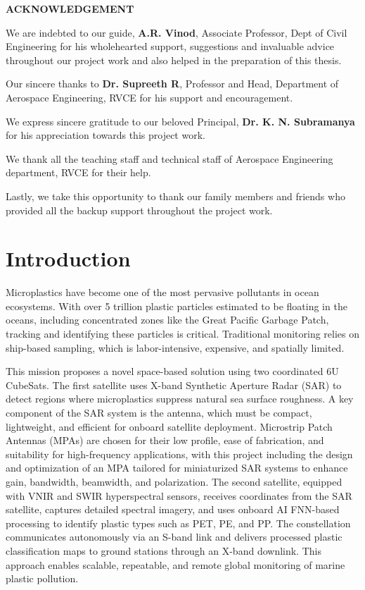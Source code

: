 \documentclass[12pt]{article}
\begin{document}
\newpage
\thispagestyle{empty}

\begin{center}
{\Large \textbf{ACKNOWLEDGEMENT}}
\end{center}

\vspace{1.5cm}

We are indebted to our guide, \textbf{A.R. Vinod}, Associate Professor, Dept of Civil Engineering for his wholehearted support, suggestions and invaluable advice throughout our project work and also helped in the preparation of this thesis.

Our sincere thanks to \textbf{Dr. Supreeth R}, Professor and Head, Department of Aerospace Engineering, RVCE for his support and encouragement.

We express sincere gratitude to our beloved Principal, \textbf{Dr. K. N. Subramanya} for his appreciation towards this project work.

We thank all the teaching staff and technical staff of Aerospace Engineering department, RVCE for their help.

Lastly, we take this opportunity to thank our family members and friends who provided all the backup support throughout the project work.

\newpage
\tableofcontents
\newpage

\section{Introduction}
Microplastics have become one of the most pervasive pollutants in ocean ecosystems. With over 5 trillion plastic particles estimated to be floating in the oceans, including concentrated zones like the Great Pacific Garbage Patch, tracking and identifying these particles is critical. Traditional monitoring relies on ship-based sampling, which is labor-intensive, expensive, and spatially limited.

This mission proposes a novel space-based solution using two coordinated 6U CubeSats. The first satellite uses X-band Synthetic Aperture Radar (SAR) to detect regions where microplastics suppress natural sea surface roughness. A key component of the SAR system is the antenna, which must be compact, lightweight, and efficient for onboard satellite deployment. Microstrip Patch Antennas (MPAs) are chosen for their low profile, ease of fabrication, and suitability for high-frequency applications, with this project including the design and optimization of an MPA tailored for miniaturized SAR systems to enhance gain, bandwidth, beamwidth, and polarization. The second satellite, equipped with VNIR and SWIR hyperspectral sensors, receives coordinates from the SAR satellite, captures detailed spectral imagery, and uses onboard AI FNN-based processing to identify plastic types such as PET, PE, and PP. The constellation communicates autonomously via an S-band link and delivers processed plastic classification maps to ground stations through an X-band downlink. This approach enables scalable, repeatable, and remote global monitoring of marine plastic pollution.
\end{document}

